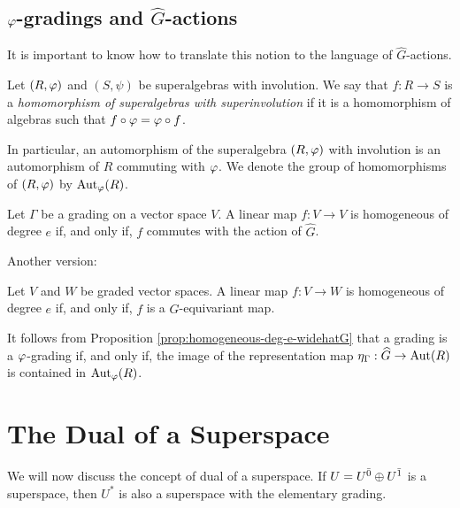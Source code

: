 \documentclass{amsbook}
\begin{document}
\section{$\varphi$-gradings and $\widehat G$-actions}

It is important to know how to translate this notion to the language of $\widehat G$-actions.

\begin{defi}
    Let $(R,\varphi)$ and $(S, \psi)$ be superalgebras with involution. We say that $f: R \to S$ is a \emph{homomorphism of superalgebras with superinvolution} if it is a homomorphism of algebras such that $f\circ \varphi = \varphi \circ f$.
\end{defi}

In particular, an automorphism of the superalgebra $(R, \varphi)$ with involution is an automorphism of $R$ commuting with $\varphi$. We denote the group of homomorphisms of $(R, \varphi)$ by $\operatorname{Aut}_\varphi(R)$.

\begin{prop}
    Let $\Gamma$ be a grading on a vector space $V$. A linear map $f: V \to V$ is homogeneous of degree $e$ if, and only if, $f$ commutes with the action of $\widehat G$.
\end{prop}

Another version:

\begin{prop}\label{prop:homogeneous-deg-e-widehatG}
    Let $V$ and $W$ be graded vector spaces. A linear map $f: V \to W$ is homogeneous of degree $e$ if, and only if, $f$ is a $\widehat G$-equivariant map.
\end{prop}

It follows from Proposition \ref{prop:homogeneous-deg-e-widehatG} that a grading is a $\varphi$-grading if, and only if, the image of the representation map $\eta_\Gamma: \widehat G \to \operatorname{Aut} (R)$ is contained in $\operatorname{Aut}_\varphi(R)$.


\chapter{The Dual of a Superspace}

We will now discuss the concept of dual of a superspace. If $U = U^{\bar0} \oplus U^{\bar1}$ is a superspace, then $U^*$ is also a superspace with the elementary grading.
\end{document}
